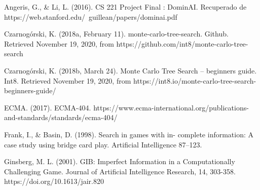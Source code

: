 \documentclass[11pt, oneside]{book}
\begin{document}
\begin{thebibliography}{111}






       Angeris, G., \& Li, L. (2016). CS 221 Project Final :
      DominAI. Recuperado de
      https://web.stanford.edu/~guillean/papers/dominai.pdf

      Czarnogórski, K. (2018a, February 11).
      monte-carlo-tree-search. Github. Retrieved November 19, 2020, from
      https://github.com/int8/monte-carlo-tree-search
      
      Czarnogórski, K. (2018b, March 24). Monte Carlo Tree Search
      – beginners guide. Int8. Retrieved November 19, 2020, from
      https://int8.io/monte-carlo-tree-search-beginners-guide/

      ECMA. (2017). ECMA-404.
      https://www.ecma-international.org/publications-and-standards/standards/ecma-404/

      Frank, I., \& Basin, D. (1998). Search in games with in-
      complete information: A case study using bridge card play. Artificial
      Intelligence 87–123.

      Ginsberg, M. L. (2001). GIB: Imperfect Information in
      a Computationally Challenging Game. Journal of Artificial Intelligence
      Research, 14, 303-358. https://doi.org/10.1613/jair.820


\end{thebibliography}
\end{document}
